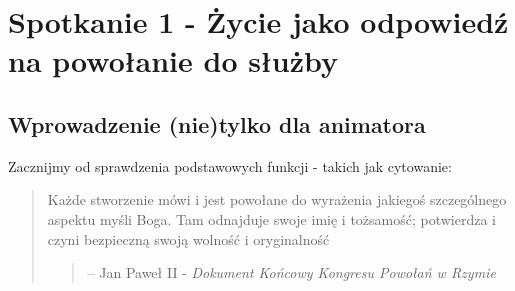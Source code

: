 \documentclass[a5paper,10pt,polish]{book}
\begin{document}
\chapter{Spotkanie 1 - Życie jako odpowiedź na powołanie do służby}
\label{miliardowice-2005-jesien/spotkanie1:spotkanie-1-zycie-jako-odpowiedz-na-powolanie-do-sluzby}\label{miliardowice-2005-jesien/spotkanie1::doc}

\section{Wprowadzenie (nie)tylko dla animatora}
\label{miliardowice-2005-jesien/spotkanie1:wprowadzenie-nie-tylko-dla-animatora}
Zacznijmy od sprawdzenia podstawowych funkcji - takich jak cytowanie:
\begin{quote}

Każde stworzenie mówi i jest powołane do wyrażenia jakiegoś szczególnego aspektu myśli Boga. Tam odnajduje swoje imię i tożsamość; potwierdza i czyni bezpieczną swoją wolność i oryginalność
\begin{quote}

--  Jan Paweł II - \emph{Dokument Końcowy Kongresu Powołań w Rzymie}
\end{quote}
\end{quote}
\end{document}
